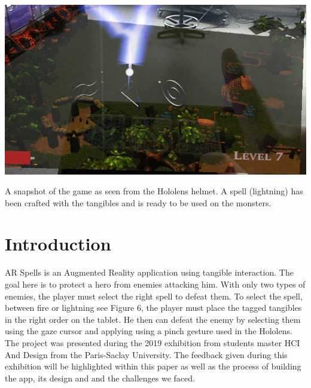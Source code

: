 \documentclass[sigchi, authorversion, screen]{acmart}
\begin{document}
%

%
  \begin{teaserfigure}
\includegraphics[width=\textwidth]{game_overview.jpg}
  \caption{A snapshot of the game as seen from the Hololens helmet. A spell (lightning) has been crafted with the tangibles and is ready to be used on the monsters.}
  \label{fig:game_teaser}
\end{teaserfigure}


%
\maketitle

\section{Introduction}

AR Spells is an Augmented Reality application using tangible interaction. The goal here is to protect a hero from enemies attacking him. With only two types of enemies, the player must select the right spell to defeat them. To select the spell, between fire or lightning see Figure 6, the player must place the tagged tangibles in the right order on the tablet. He then can defeat the enemy by selecting them using the gaze cursor and applying using a pinch gesture used in the Hololens. The project was presented during the 2019 exhibition from students master HCI And Design from the Paris-Saclay University. The feedback given during this exhibition will be highlighted within this paper as well as the process of building the app, its design and and the challenges we faced.
\end{document}
